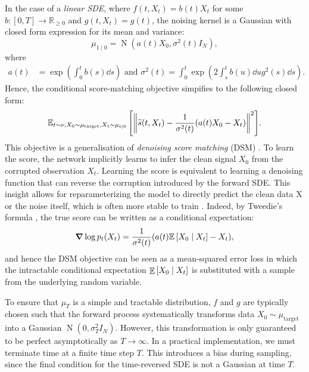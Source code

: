 In the case of a \textit{linear SDE}, where \(f(t, X_{t}) = b(t) X_{t}\)  for some \(b : [0, T] \to \mathbb{R}_{\geq 0}\) and \(g(t, X_{t}) = g(t)\), the noising kernel is a Gaussian with closed form expression for its mean and variance:
\[
  \mu_{1 \mid 0} = \operatorname{N}(a(t) X_{0}, \sigma^{2}(t) I_{N}),
\]
where
\begin{align*}
  a(t) &= \exp(\int_{0}^{t}b(s) \dd{s}) \text{ and } \sigma^{2}(t) = \int_{0}^{t} \exp(2 \int_{s}^{t} b(u) \dd{u} g^{2}(s) \dd{s}).
\end{align*}
Hence, the conditional score-matching objective simpifies to the following closed form:
\begin{equation}
  \mathop{\mathbb{E}_{t\sim \nu, X_{0} \sim \mu_{\text{target}}, X_{t} \sim \mu_{t \mid 0}}}\qty[\norm{ \widetilde{s}(t, X_{t}) - \frac{1}{\sigma^{2}(t)} \qty(a(t) X_{0} - X_{t}) }^{2}]. \label{eqn:dsm}
\end{equation}
This objective is a generalisation of \textit{denoising score matching} (DSM) \citep{vincent2011connection,song2019generative}. To learn the score, the network implicitly learns to infer the clean signal \(X_{0}\) from the corrupted observation \(X_{t}\). Learning the score is equivalent to learning a denoising function that can reverse the corruption introduced by the forward SDE. This insight allows for reparameterizing the model to directly predict the clean data X or the noise itself, which is often more stable to train \citep{karras2022elucidating}. Indeed, by Tweedie's formula \citep{efron2011tweedie}, the true score can be written as a conditional expectation:
\begin{equation}
  \grad \log p_{t}(X_{t}) = \frac{1}{\sigma^{2}(t)} \qty(\mathop{ a(t) \mathbb{E}}\qty[X_{0} \mid X_{t}] - X_{t}), \label{eqn:twe}
\end{equation}
and hence the DSM objective can be seen as a mean-squared error loss in which the intractable conditional expectation \(\mathop{\mathbb{E}}\qty[X_{0} \mid X_{t}]\) is substituted with a sample from the underlying random variable.

To ensure that \(\mu_{T}\) is a simple and tractable distribution, \(f\) and \(g\) are typically chosen such that the forward process systematically transforms data \(X_{0} \sim \mu_{\text{target}}\) into a Gaussian \(\operatorname{N}(0, \sigma^{2}_{T} I_{N})\). However, this transformation is only guaranteed to be perfect asymptotically as \(T \to \infty\). In a practical implementation, we must terminate time at a finite time step \(T\). This introduces a bias during sampling, since the final condition for the time-reversed SDE is not a Gaussian at time \(T\).

